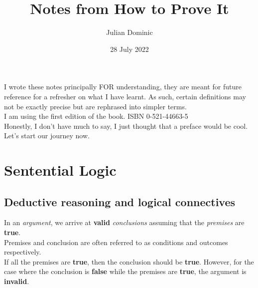 \documentclass[../setup.tex]{subfiles}
\begin{document}
\title{Notes from How to Prove It}
\author{Julian Dominic}
\date{28 July 2022}
\maketitle
\clearpage


\newcommand{\prefacename}{Preface}
\newenvironment{preface}{
    {\noindent \bfseries \Huge \prefacename}
    \begin{center}
        \thispagestyle{plain}
    \end{center}%
}



\preface
I wrote these notes principally FOR understanding, they are meant for future reference for a refresher on what I have learnt. As such, certain definitions may not be exactly precise but are rephrased into simpler terms. \\
I am using the first edition of the book. ISBN 0-521-44663-5 \\
Honestly, I don't have much to say, I just thought that a preface would be cool. Let's start our journey now.



\tableofcontents
{}
\clearpage

\setcounter{page}{1}



\section{Sentential Logic}
\subsection{Deductive reasoning and logical connectives}
In an \textit{argument}, we arrive at \textbf{valid} \textit{conclusions} assuming that the \textit{premises} are \textbf{true}. \\ 
Premises and conclusion are often referred to as conditions and outcomes respectively. \\
If all the premises are \textbf{true}, then the conclusion should be \textbf{true}. However, for the case where the conclusion is \textbf{false} while the premises are \textbf{true}, the argument is \textbf{invalid}.
\end{document}
